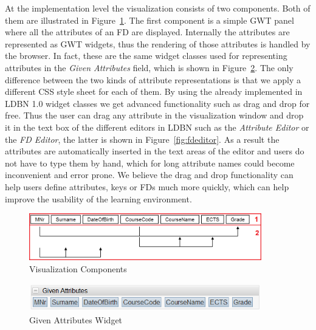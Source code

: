 At the implementation level the visualization consists of two components. 
Both of them are illustrated in Figure~\ref{fig:impl-fds01}.
The first component is a simple GWT panel where all the attributes of an FD are displayed. 
Internally the attributes are represented as GWT widgets, thus the rendering of those attributes is
handled by the browser. In fact, these are the same widget classes used for representing
attributes in the \emph{Given Attributes} field, which is shown in Figure~\ref{fig:given-atts}. 
The only difference between the two kinds of attribute representations is 
that we apply a different CSS style sheet for each of them. By using the already implemented in LDBN 1.0 
widget classes we get advanced functionality such as drag and drop for free. Thus the user
can drag any attribute in the visualization window and drop 
it in the text box of the different editors in LDBN
such as the \emph{Attribute Editor} or the \emph{FD Editor}, the latter is 
shown in Figure~\ref{fig:fdeditor}. 
As a result the
attributes are automatically inserted in the text areas of the editor and users do not have
to type them by hand, which for long attribute names could become inconvenient and error prone. 
We believe the drag and drop functionality can help
users define attributes, keys or FDs much more quickly, which can
help improve the usability of the learning environment.

\begin{figure}[h]
	\begin{center}
		\includegraphics[width=0.9\textwidth]{./img/impl-fds01.png}
		\caption{Visualization Components}
		\label{fig:impl-fds01}
	\end{center}
\end{figure}

\begin{figure}[h]
	\begin{center}
		\includegraphics[width=0.9\textwidth]{./img/given-atts.png}
		\caption{Given Attributes Widget}
		\label{fig:given-atts}
	\end{center}
\end{figure}


